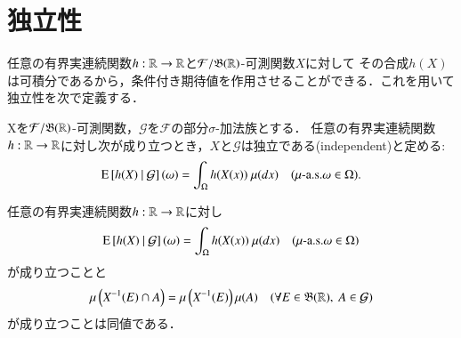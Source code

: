\section{独立性}
	任意の有界実連続関数$h:\mathbb{R} \rightarrow \mathbb{R}$と$\mathcal{F}/\mathfrak{B}(\mathbb{R})$-可測関数$X$に対して
	その合成$h(X)$は可積分であるから，条件付き期待値を作用させることができる．これを用いて独立性を次で定義する．
	
	\begin{screen}
		\begin{dfn}[独立性]
			Xを$\mathcal{F}/\mathfrak{B}(\mathbb{R})$-可測関数，$\mathcal{G}$を$\mathcal{F}$の部分$\sigma$-加法族とする．
			任意の有界実連続関数$h:\mathbb{R} \rightarrow \mathbb{R}$に対し次が成り立つとき，$X$と$\mathcal{G}$は独立である(independent)と定める:
			\begin{align}
				\cexp{h(X)}{\mathcal{G}}(\omega) = \int_\Omega h(X(x))\ \mu(dx)
				\quad (\mbox{$\mu$-a.s.}\omega \in \Omega).
			\end{align}
		\end{dfn}
	\end{screen}
	
	\begin{screen}
		\begin{prp}[独立性の同値条件]
			任意の有界実連続関数$h:\mathbb{R} \rightarrow \mathbb{R}$に対し
			\begin{align}
				\cexp{h(X)}{\mathcal{G}}(\omega) = \int_\Omega h(X(x))\ \mu(dx)
				\quad (\mbox{$\mu$-a.s.}\omega \in \Omega)
				\label{eq:prp_equivalent_condition_of_independence_1}
			\end{align}
			が成り立つことと
			\begin{align}
				\mu\left( X^{-1}(E) \cap A \right) = \mu\left( X^{-1}(E) \right)\mu(A) \quad (\forall E \in \mathfrak{B}(\mathbb{R}),\ A \in \mathcal{G})
				\label{eq:prp_equivalent_condition_of_independence_2}
			\end{align}
			が成り立つことは同値である．
			\label{prp:equivalent_condition_of_independence}
		\end{prp}
	\end{screen}
	
